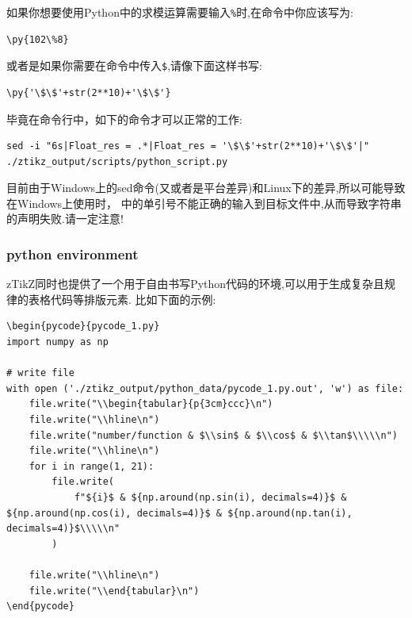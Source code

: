 如果你想要使用Python中的求模运算需要输入\texttt{\%}时,在\cmd{\py}命令中你应该写为:
\begin{verbatim}
\py{102\%8}
\end{verbatim}
    
或者是如果你需要在\cmd{\py}命令中传入\texttt{\$},请像下面这样书写:
\begin{verbatim}
\py{'\$\$'+str(2**10)+'\$\$'}
\end{verbatim}

毕竟在命令行中，如下的命令才可以正常的工作:
\begin{verbatim}
sed -i "6s|Float_res = .*|Float_res = '\$\$'+str(2**10)+'\$\$'|" ./ztikz_output/scripts/python_script.py
\end{verbatim}

\begin{remark}
目前由于Windows上的sed命令(又或者是平台差异)和Linux下的差异,所以可能导致在Windows上使用时，
\cmd{\py}中的单引号不能正确的输入到目标文件中,从而导致字符串的声明失败.请一定注意!
\end{remark}


\subsubsection{python environment}
zTikZ同时也提供了一个用于自由书写Python代码的环境,可以用于生成复杂且规律的表格代码等排版元素.
比如下面的示例:
\begin{verbatim}
\begin{pycode}{pycode_1.py}
import numpy as np

# write file
with open ('./ztikz_output/python_data/pycode_1.py.out', 'w') as file:
    file.write("\\begin{tabular}{p{3cm}ccc}\n")
    file.write("\\hline\n")
    file.write("number/function & $\\sin$ & $\\cos$ & $\\tan$\\\\\n")
    file.write("\\hline\n")
    for i in range(1, 21):
        file.write(
            f"${i}$ & ${np.around(np.sin(i), decimals=4)}$ &  ${np.around(np.cos(i), decimals=4)}$ & ${np.around(np.tan(i), decimals=4)}$\\\\\n"
        )

    file.write("\\hline\n")
    file.write("\\end{tabular}\n")
\end{pycode}
\end{verbatim}


